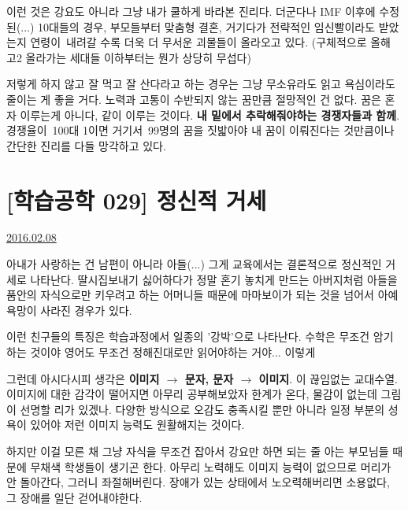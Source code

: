 이런 것은 강요도 아니라 그냥 내가 쿨하게 바라본 진리다.
더군다나 IMF 이후에 수정된(...) 10대들의 경우, 부모들부터 맞춤형 결혼, 거기다가 전략적인 임신빨이라도 받았는지
연령이 내려갈 수록 더욱 더 무서운 괴물들이 올라오고 있다.
(구체적으로 올해 고2 올라가는 세대들 이하부터는 뭔가 상당히 무섭다)
\vspace{5mm}

저렇게 하지 않고 잘 먹고 잘 산다라고 하는 경우는 그냥 무소유라도 읽고 욕심이라도 줄이는 게 좋을 거다.
노력과 고통이 수반되지 않는 꿈만큼 절망적인 건 없다.
꿈은 혼자 이루는게 아니다, 같이 이루는 것이다. \textbf{내 밑에서 추락해줘야하는 경쟁자들과 함께}.
경쟁율이 100대 1이면 거기서 99명의 꿈을 짓밟아야 내 꿈이 이뤄진다는 것만큼이나 간단한 진리를 다들 망각하고 있다.
\vspace{5mm}




\section{[학습공학 029] 정신적 거세}
\href{https://www.kockoc.com/Apoc/627852}{2016.02.08}

\vspace{5mm}

아내가 사랑하는 건 남편이 아니라 아들(...)
그게 교육에서는 결론적으로 정신적인 거세로 나타난다.
딸시집보내기 싫어하다가 정말 혼기 놓치게 만드는 아버지처럼
아들을 품안의 자식으로만 키우려고 하는 어머니들 때문에 마마보이가 되는 것을 넘어서 아예 욕망이 사라진 경우가 있다.
\vspace{5mm}

이런 친구들의 특징은 학습과정에서 일종의 '강박'으로 나타난다.
수학은 무조건 암기하는 것이야
영어도 무조건 정해진대로만 읽어야하는 거야... 이렇게
\vspace{5mm}

그런데 아시다시피 생각은 \textbf{이미지 $\rightarrow$ 문자, 문자 $\rightarrow$ 이미지}. 이 끊임없는 교대수열.
이미지에 대한 감각이 떨어지면 아무리 공부해보았자 한계가 온다, 물감이 없는데 그림이 선명할 리가 있겠나.
다양한 방식으로 오감도 충족시킬 뿐만 아니라 일정 부분의 성욕이 있어야 저런 이미지 능력도 원활해지는 것이다.
\vspace{5mm}

하지만 이걸 모른 채 그냥 자식을 무조건 잡아서 강요만 하면 되는 줄 아는 부모님들 때문에 무채색 학생들이 생기곤 한다.
아무리 노력해도 이미지 능력이 없으므로 머리가 안 돌아간다, 그러니 좌절해버린다.
장애가 있는 상태에서 노오력해버리면 소용없다, 그 장애를 일단 걷어내야한다.
\vspace{5mm}

